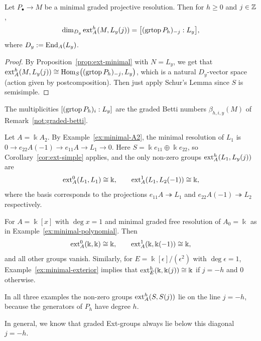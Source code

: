 \begin{corollary}\label{cor:ext-simple}
Let $P_\bullet\to M$ be a minimal graded projective resolution.
Then for $h\geq0$ and $j\in\mathbb{Z}$,
\[
\dim_{D_y}\operatorname{ext}\nolimits_A^h(M,L_y(j))=\bigl[(\operatorname{grtop}\nolimits P_h)_{-j}:L_y\bigr],
\]
where $D_y:=\operatorname{End}\nolimits_A(L_y)$.
\end{corollary}

\begin{proof}
By Proposition~\ref{prop:ext-minimal} with $N=L_y$, we get that $\operatorname{ext}\nolimits_A^h(M,L_y(j))\cong\operatorname{Hom}\nolimits_S\bigl((\operatorname{grtop}\nolimits P_h)_{-j},L_y\bigr)$, which is a natural $D_y$-vector space (action given by postcomposition).
Then just apply Schur's Lemma since $S$ is semisimple.
\end{proof}

\begin{advanced}
The multiplicities $[(\operatorname{grtop}\nolimits P_h)_i:L_y]$ are the graded Betti numbers $\beta_{h,i,y}(M)$ of Remark~\ref{not:graded-betti}.
\end{advanced}

\begin{example}\label{ex:ext-A2}
Let $A=\Bbbk A_2$.
By Example~\ref{ex:minimal-A2}, the minimal resolution of $L_1$ is $0\to e_{22}A(-1)\to e_{11}A\to L_1\to0$.
Here $S=\Bbbk e_{11}\oplus\Bbbk e_{22}$, so Corollary~\ref{cor:ext-simple} applies, and the only non-zero groups $\operatorname{ext}\nolimits_A^h(L_1,L_y(j))$ are
\[
\operatorname{ext}\nolimits_A^0(L_1,L_1)\cong\Bbbk,\qquad\operatorname{ext}\nolimits_A^1(L_1,L_2(-1))\cong\Bbbk,
\]
where the basis corresponds to the projections $e_{11}A\twoheadrightarrow L_1$ and $e_{22}A(-1)\twoheadrightarrow L_2$ respectively.
\end{example}

\begin{example}\label{ex:ext-polynomial-exterior}
For $A=\Bbbk[x]$ with $\deg x=1$ and minimal graded free resolution of $A_0=\Bbbk$ as in Example~\ref{ex:minimal-polynomial}.  Then
\[
\operatorname{ext}\nolimits_A^0(\Bbbk,\Bbbk)\cong\Bbbk,\qquad\operatorname{ext}\nolimits_A^1(\Bbbk,\Bbbk(-1))\cong\Bbbk,
\]
and all other groups vanish.
Similarly, for $E=\Bbbk[\epsilon]/(\epsilon^2)$ with $\deg\epsilon=1$, Example~\ref{ex:minimal-exterior} implies that $\operatorname{ext}\nolimits_E^h(\Bbbk,\Bbbk(j))\cong\Bbbk$ if $j=-h$ and $0$ otherwise.
\end{example}

In all three examples the non-zero groups $\operatorname{ext}\nolimits_A^h(S,S(j))$ lie on the line $j=-h$, because the generators of $P_h$ have degree $h$.

In general, we know that graded Ext-groups always lie below this diagonal $j=-h$.

